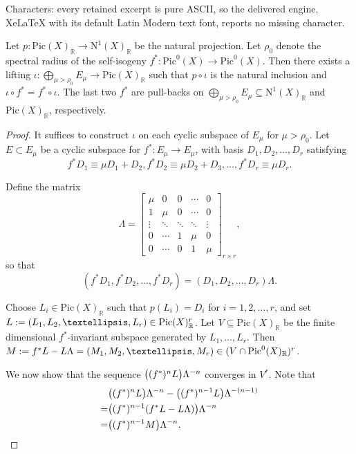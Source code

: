 \documentclass[10pt,a4paper]{amsart}
\newcommand\ra{\rightarrow}
\newcommand{\mb}[1]{\mathbb{#1}}
\newcommand{\mib}[1]{\textit{\textbf{#1}}}
\newcommand{\mr}[1]{\mathrm{#1}}
\begin{document}
Characters: every retained excerpt is pure ASCII, so the delivered engine, XeLaTeX with its default Latin Modern text font, reports no missing character.
\begin{lemma}\label{Lem_lift}
Let $p: \mr{Pic}(X)_{\mb{R}}\ra \mr{N}^1(X)_{\mb{R}}$ be the natural projection. Let $\rho_0$ denote the spectral radius of the self-isogeny $f^*: \mr{Pic}^0(X)\ra \mr{Pic}^0(X)$. Then there exists a lifting $\iota: \bigoplus\limits_{\mu>\rho_0}E_{\mu}\ra \mr{Pic}(X)_{\mb{R}}$ such that $p\circ\iota$ is the natural inclusion and $\iota\circ f^*=f^*\circ\iota$. The last two $f^*$ are pull-backs on $\bigoplus\limits_{\mu>\rho_0}E_{\mu}\subseteq\mathrm{N}^1(X)_{\mathbb{R}}$ and $\mathrm{Pic}(X)_{\mathbb{R}}$, respectively.
\end{lemma}

\begin{proof}
It suffices to construct $\iota$ on each cyclic subspace of $E_\mu$ for $\mu > \rho_0$. Let $E \subset E_\mu$ be a cyclic subspace for $f^*: E_\mu \to E_\mu$, with basis $D_1, D_2, \ldots, D_r$ satisfying
\[f^*D_1\equiv \mu D_1+D_2, f^*D_2\equiv\mu D_2+D_3,\ldots, f^*D_r\equiv\mu D_r.\]

Define the matrix
\[
\Lambda = 
\begin{bmatrix}
\mu & 0 & 0 & \cdots & 0 \\
1 & \mu & 0 & \cdots & 0 \\
\vdots & \ddots & \ddots & \ddots & \vdots \\
0 & \cdots & 1 & \mu & 0 \\
0 & \cdots & 0 & 1 & \mu
\end{bmatrix}_{r\times r},
\]
so that
\[(f^*D_1,f^*D_2,\ldots,f^*D_r)=(D_1,D_2,\ldots,D_r)\Lambda.\]

Choose $L_i\in \mr{Pic}(X)_{\mb{R}}$ such that $p(L_i)=D_i$ for $i=1,2,\ldots,r$, and set $\mib{L}:=(L_1,L_2,\ldots,L_r)\in \mr{Pic}(X)_{\mb{R}}^{r}$. Let $V\subseteq\mr{Pic}(X)_{\mb{R}}$ be the finite dimensional $f^*$-invariant subspace generated by $L_1,\dots,L_r$. Then $\mib{M}:=f^*\mib{L}-\mib{L}\Lambda=(M_1,M_2,\ldots,M_r) \in (V\cap\mr{Pic}^0(X)_{\mb{R}})^r$.

We now show that the sequence $\big((f^*)^n\mib{L}\big)\Lambda^{-n}$ converges in $V^{r}$. Note that
\[
\begin{aligned}
&\big((f^*)^n\mib{L}\big)\Lambda^{-n}-\big((f^*)^{n-1}\mib{L}\big)\Lambda^{-(n-1)}\\
=&\big((f^{*})^{n-1}(f^*\mib{L}-\mib{L}\Lambda)\big)\Lambda^{-n}  \\
=&\big((f^{*})^{n-1}\mib{M}\big)\Lambda^{-n}. \\
\end{aligned}
\]


\end{proof}
\end{document}
